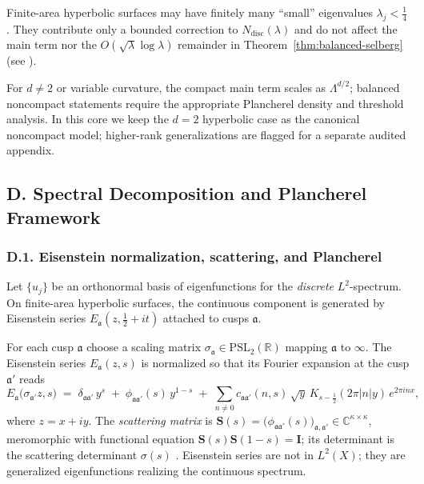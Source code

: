 \begin{remark}
Finite-area hyperbolic surfaces may have finitely many ``small'' eigenvalues $\lambda_j<\tfrac14$.
They contribute only a bounded correction to $N_{\mathrm{disc}}(\lambda)$ and do not affect the main term nor the $O(\sqrt{\lambda}\log\lambda)$ remainder in Theorem~\ref{thm:balanced-selberg} (see \cite{Hejhal1983II}).
\end{remark}

\begin{remark}
For $d\ne 2$ or variable curvature, the compact main term scales as $\Lambda^{d/2}$; balanced noncompact statements require the appropriate Plancherel density and threshold analysis. In this core we keep the $d=2$ hyperbolic case as the canonical noncompact model; higher-rank generalizations are flagged for a separate audited appendix.
\end{remark}


\subsection*{D. Spectral Decomposition and Plancherel Framework}
\label{subsec:spectral-decomposition}

\subsubsection*{D.1. Eisenstein normalization, scattering, and Plancherel}

Let $\{u_j\}$ be an orthonormal basis of eigenfunctions for the \emph{discrete} $L^2$-spectrum.
On finite-area hyperbolic surfaces, the continuous component is generated by Eisenstein series
$E_{\mathfrak a}(z,\tfrac12+it)$ attached to cusps $\mathfrak a$.

\begin{remark}
For each cusp $\mathfrak a$ choose a scaling matrix $\sigma_{\mathfrak a}\in \mathrm{PSL}_2(\mathbb{R})$ mapping $\mathfrak a$ to $\infty$.
The Eisenstein series $E_{\mathfrak a}(z,s)$ is normalized so that its Fourier expansion at the cusp $\mathfrak a'$ reads
\[
  E_{\mathfrak a}\!\big(\sigma_{\mathfrak a'}z,s\big)
  \;=\;
  \delta_{\mathfrak a\mathfrak a'}\,y^s
  \;+\;
  \phi_{\mathfrak a\mathfrak a'}(s)\,y^{1-s}
  \;+\;
  \sum_{n\neq 0} c_{\mathfrak a\mathfrak a'}(n,s)\,\sqrt{y}\,K_{s-\frac12}(2\pi|n|y)\,e^{2\pi i n x},
\]
where $z=x+iy$. The \emph{scattering matrix} is
$\mathbf S(s)=\big(\phi_{\mathfrak a\mathfrak a'}(s)\big)_{\mathfrak a,\mathfrak a'}\in\mathbb C^{\kappa\times\kappa}$,
meromorphic with functional equation $\mathbf S(s)\mathbf S(1-s)=\mathbf I$; its determinant is the scattering determinant $\sigma(s)$ \cite{Hejhal1983II,LaxPhillips1976}. Eisenstein series are not in $L^2(X)$; they are generalized eigenfunctions realizing the continuous spectrum.
\end{remark}

